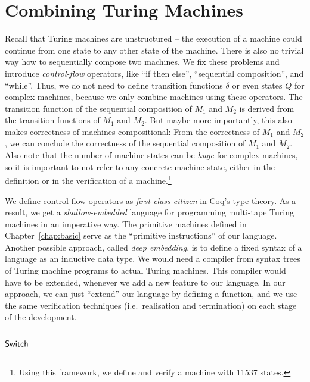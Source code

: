 \chapter{Combining Turing Machines}
\label{chap:combining}

Recall that Turing machines are unstructured -- the execution of a machine could continue from one state to any other state of the machine.  There is
also no trivial way how to sequentially compose two machines.  We fix these problems and introduce \textit{control-flow} operators, like ``if then
else'', ``sequential composition'', and ``while''.  Thus, we do not need to define transition functions $\delta$ or even states $Q$ for complex
machines, because we only combine machines using these operators.  The transition function of the sequential composition of $M_1$ and $M_2$ is derived
from the transition functions of $M_1$ and $M_2$.  But maybe more importantly, this also makes correctness of machines compositional: From the
correctness of $M_1$ and $M_2$, we can conclude the correctness of the sequential composition of $M_1$ and $M_2$.  Also note that the number of
machine states can be \textit{huge} for complex machines, so it is important to not refer to any concrete machine state, either in the definition or
in the verification of a machine.\footnote{Using this framework, we define and verify a machine with 11537 states.}

We define control-flow operators as \textit{first-class citizen} in Coq's type theory.  As a result, we get a \textit{shallow-embedded} language for
programming multi-tape Turing machines in an imperative way.  The primitive machines defined in Chapter~\ref{chap:basic} serve as the ``primitive
instructions'' of our language.  Another possible approach, called \textit{deep embedding}, is to define a fixed syntax of a language as an inductive
data type.  We would need a compiler from syntax trees of Turing machine programs to actual Turing machines.  This compiler would have to be extended,
whenever we add a new feature to our language.  In our approach, we can just ``extend'' our language by defining a function, and we use the same
verification techniques (i.e.\ realisation and termination) on each stage of the development.


\section{$\mathsf{Switch}$}
\label{sec:switch}


